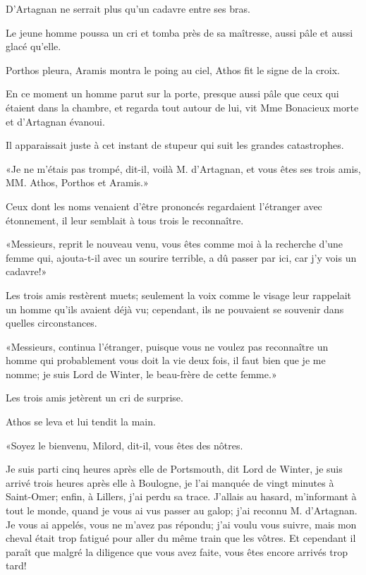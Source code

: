 D'Artagnan ne serrait plus qu'un cadavre entre ses bras. 

Le jeune homme poussa un cri et tomba près de sa maîtresse, aussi pâle et aussi glacé qu'elle. 

Porthos pleura, Aramis montra le poing au ciel, Athos fit le signe de la croix. 

En ce moment un homme parut sur la porte, presque aussi pâle que ceux qui étaient dans la chambre, et regarda tout autour de lui, vit Mme Bonacieux morte et d'Artagnan évanoui. 

Il apparaissait juste à cet instant de stupeur qui suit les grandes catastrophes. 

«Je ne m'étais pas trompé, dit-il, voilà M. d'Artagnan, et vous êtes ses trois amis, MM. Athos, Porthos et Aramis.» 

Ceux dont les noms venaient d'être prononcés regardaient l'étranger avec étonnement, il leur semblait à tous trois le reconnaître. 

«Messieurs, reprit le nouveau venu, vous êtes comme moi à la recherche d'une femme qui, ajouta-t-il avec un sourire terrible, a dû passer par ici, car j'y vois un cadavre!» 

Les trois amis restèrent muets; seulement la voix comme le visage leur rappelait un homme qu'ils avaient déjà vu; cependant, ils ne pouvaient se souvenir dans quelles circonstances. 

«Messieurs, continua l'étranger, puisque vous ne voulez pas reconnaître un homme qui probablement vous doit la vie deux fois, il faut bien que je me nomme; je suis Lord de Winter, le beau-frère de cette femme.» 

Les trois amis jetèrent un cri de surprise. 

Athos se leva et lui tendit la main. 

«Soyez le bienvenu, Milord, dit-il, vous êtes des nôtres. 

\speak  Je suis parti cinq heures après elle de Portsmouth, dit Lord de Winter, je suis arrivé trois heures après elle à Boulogne, je l'ai manquée de vingt minutes à Saint-Omer; enfin, à Lillers, j'ai perdu sa trace. J'allais au hasard, m'informant à tout le monde, quand je vous ai vus passer au galop; j'ai reconnu M. d'Artagnan. Je vous ai appelés, vous ne m'avez pas répondu; j'ai voulu vous suivre, mais mon cheval était trop fatigué pour aller du même train que les vôtres. Et cependant il paraît que malgré la diligence que vous avez faite, vous êtes encore arrivés trop tard! 

